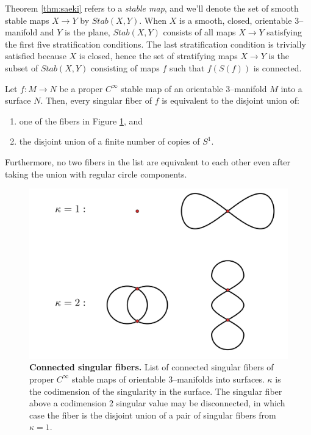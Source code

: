 Theorem \ref{thm:saeki} refers to a \emph{stable map}, and we'll denote the set of smooth stable maps $X\to Y$ by $Stab(X,Y)$.
When $X$ is a smooth, closed, orientable 3--manifold and $Y$ is the plane, $Stab(X,Y)$ consists of all maps $X\to Y$ satisfying the first five stratification conditions.
The last stratification condition is trivially satisfied because $X$ is closed, hence the set of stratifying maps $X\to Y$ is the subset of $Stab(X,Y)$ consisting of maps $f$ such that $f(S(f))$ is connected.

\begin{theorem}
	\label{thm:saeki}
	Let $f:M\to N$ be a proper $C^\infty$ stable map of an orientable 3--manifold $M$ into a surface $N$.
	Then, every singular fiber of $f$ is equivalent to the disjoint union of:
	\begin{enumerate}
		\item one of the fibers in Figure \ref{fig:saeki-fibers}, and
		\item the disjoint union of a finite number of copies of $S^1$.
	\end{enumerate}
	Furthermore, no two fibers in the list are equivalent to each other even after taking the union with regular circle components.		
\end{theorem}

\begin{figure}[h!]
	\centering
	\includegraphics{figures/saeki-fibers.png}
	\caption{
		\textbf{Connected singular fibers.}
		List of connected singular fibers of proper $C^\infty$ stable maps of orientable 3--manifolds into surfaces.
		$\kappa$ is the codimension of the singularity in the surface.
		The singular fiber above a codimension 2 singular value may be disconnected,
		in which case the fiber is the disjoint union of a pair of singular fibers from $\kappa=1$.
	}
	\label{fig:saeki-fibers}	
\end{figure}

